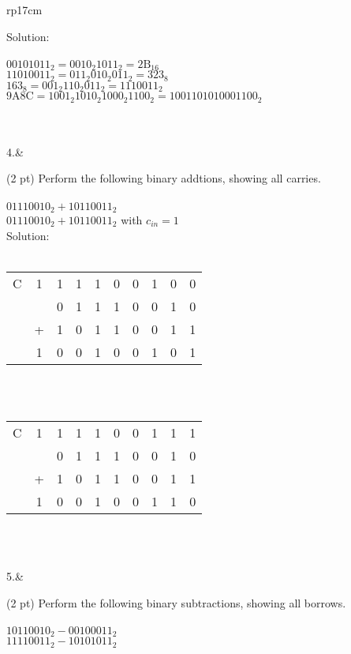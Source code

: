 \documentclass{article}
\begin{document}
\begin{longtable}[l]{rp{17cm}}
\begin{minipage}[t]{\linewidth}
Solution: \\
\\
$00101011_2 = 0010_2 1011_2 = 2\textrm{B}_{16}$ \\
$11010011_2 = 011_2 010_2 011_2 = 323_8$ \\
$163_8 = 001_2 110_2 011_2 = 1110011_2$ \\
$9\textrm{A}8\textrm{C} = 1001_2 1010_2 1000_2 1100_2 = 1001101010001100_2$ \\
\\
\end{minipage}\\
\medskip
4.&\begin{minipage}[t]{\linewidth}(2 pt) Perform the following binary addtions, showing all carries. \\
\\
$01110010_2 + 10110011_2$ \\
$01110010_2 + 10110011_2$ with $c_{in}=1$\\

Solution: \\
\\
\begin{tabular}{cccccccccc}
  C & 1 & 1 & 1 & 1 & 0 & 0 & 1 & 0 & 0 \\
    &   & 0 & 1 & 1 & 1 & 0 & 0 & 1 & 0 \\
    & + & 1 & 0 & 1 & 1 & 0 & 0 & 1 & 1 \\
  \hline
    & 1 & 0 & 0 & 1 & 0 & 0 & 1 & 0 & 1 \\
\end{tabular} \\
\\
\begin{tabular}{cccccccccc}
  C & 1 & 1 & 1 & 1 & 0 & 0 & 1 & 1 & 1 \\
    &   & 0 & 1 & 1 & 1 & 0 & 0 & 1 & 0 \\
    & + & 1 & 0 & 1 & 1 & 0 & 0 & 1 & 1 \\
  \hline
    & 1 & 0 & 0 & 1 & 0 & 0 & 1 & 1 & 0 \\
\end{tabular} \\
\end{minipage}\\
\medskip
5.&\begin{minipage}[t]{\linewidth}(2 pt) Perform the following binary subtractions, showing all borrows. \\
\\
$10110010_2 - 00100011_2$ \\
$11110011_2 - 10101011_2$\\


\end{minipage}
\end{longtable}
\end{document}
